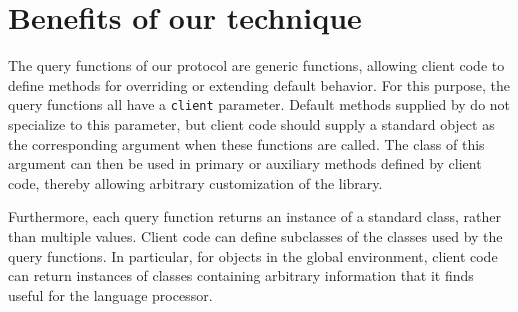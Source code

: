 \section{Benefits of our technique}
 
The query functions of our protocol are generic functions, allowing
client code to define methods for overriding or extending default
behavior.  For this purpose, the query functions all have a
\texttt{client} parameter.  Default methods supplied by \trucler{} do
not specialize to this parameter, but client code should supply a
standard object as the corresponding argument when these functions are
called.  The class of this argument can then be used in primary or
auxiliary methods defined by client code, thereby allowing arbitrary
customization of the library.

Furthermore, each query function returns an instance of a standard
class, rather than multiple values.  Client code can define subclasses
of the classes used by the query functions.  In particular, for
objects in the global environment, client code can return instances of
classes containing arbitrary information that it finds useful for the
language processor.
